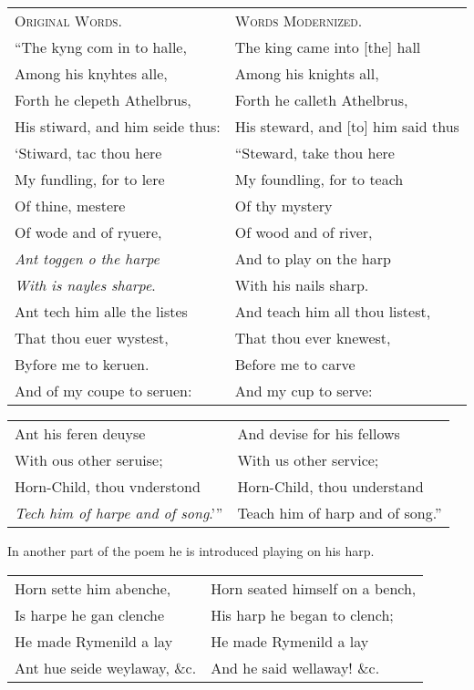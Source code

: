 \bigskip
\noindent\small\begin{tabular}{ll}
\hspace*{\fill}\textsc{Original Words.}\hspace*{\fill}&\hspace*{\fill}\textsc{Words Modernized.}\hspace*{\fill}\\
“The kyng com in to halle,&The king came into [the] hall\\
Among his knyhtes alle,&Among his knights all,\\
Forth he clepeth Athelbrus,&Forth he calleth Athelbrus,\\
His stiward, and him seide thus:&His steward, and [to] him said thus\\
‘Stiward, tac thou here&“Steward, take thou here\\
My fundling, for to lere&My foundling, for to teach\\
Of thine, mestere&Of thy mystery\\
Of wode and of ryuere,&Of wood and of river,\\
\textit{Ant toggen o the harpe}&And to play on the harp\\
\textit{With is nayles sharpe}.&With his nails sharp.\\
Ant tech him alle the listes&And teach him all thou listest,\\
That thou euer wystest,&That thou ever knewest,\\
Byfore me to keruen.&Before me to carve\\
And of my coupe to seruen:&And my cup to serve:\\
\end{tabular}
\pagebreak

\noindent\small\begin{tabular}{ll}
Ant his feren deuyse&And devise for his fellows\\
With ous other seruise;&With us other service;\\
Horn-Child, thou vnderstond&Horn-Child, thou understand\\
\textit{Tech him of harpe and of song}.’”&Teach him of harp and of song.”
\end{tabular}
\bigskip
\normalsize



\noindent In another part of the poem he is introduced playing on his harp. 

\bigskip
\noindent\small\begin{tabular}{ll}
Horn sette him abenche,&Horn seated himself on a bench,\\
Is harpe he gan clenche&His harp he began to clench;\\
He made Rymenild a lay&He made Rymenild a lay\\
Ant hue seide weylaway, \&c.\footnotemark &And he said wellaway! \&c.
\end{tabular}

